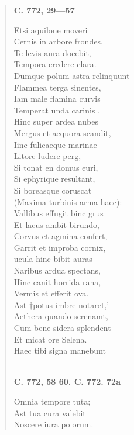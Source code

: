 \documentclass[11pt, a4paper]{report}
\begin{document}
\begin{verse}
     \marginpar{[255]} \begin{center} \textbf{C. 772, 29—57} \end{center}Etsi aquilone moveri \\ Cernis in arbore frondes, \\ Te levis aura docebit, \\ Tempora credere clara. \\ Dumque polum astra relinquunt \\ Flammea terga sinentes, \\ Iam male flamina curvis \\ Temperat unda carinis . \\ Hinc super ardea nubes \\ Mergus et aequora scandit, \\ Iinc fulicaeque marinae \\ Litore ludere perg, \\ Si tonat en domus euri, \\ Si ephyrique resultant, \\ Si boreasque coruscat \\ (Maxima turbinis arma haec): \\ Vallibus effugit binc grus \\ Et lacus ambit birundo, \\ Corvus et agmina confert, \\ Garrit et improba cornix, \\ ucula hinc bibit auras \\ Naribus ardua spectans, \\ Hinc canit horrida rana, \\ Vermis et efferit ova. \\ Ast †potus imbre notaret,’ \\ Aethera quando serenamt, \\ Cum bene sidera splendent \\ Et micat ore Selena. \\ Haec tibi signa manebunt \\ 
        ﻿\pagebreak 
     \marginpar{[256]} \begin{center} \textbf{C. 772, 58 60. C. 772. 72a} \end{center}Omnia tempore tuta; \\ Ast tua cura valebit \\ Noscere iura polorum. \\ 
      \end{verse}
  
\end{document}
